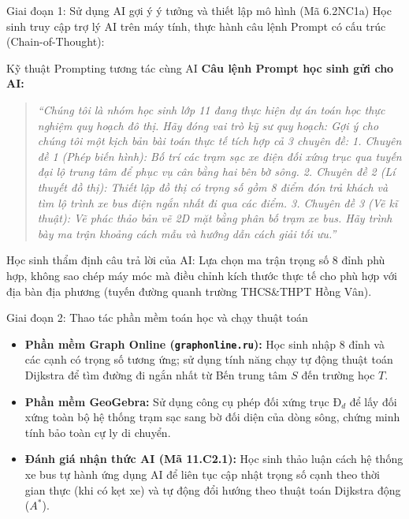 \documentclass[12pt, a4paper]{article}
\begin{document}
\begin{pedabox}{Giai đoạn 1: Sử dụng AI gợi ý ý tưởng và thiết lập mô hình (Mã 6.2NC1a)}
Học sinh truy cập trợ lý AI trên máy tính, thực hành câu lệnh Prompt có cấu trúc (Chain-of-Thought):
\begin{aibox}{Kỹ thuật Prompting tương tác cùng AI}
\textbf{Câu lệnh Prompt học sinh gửi cho AI:}
\begin{quote}
\textit{``Chúng tôi là nhóm học sinh lớp 11 đang thực hiện dự án toán học thực nghiệm quy hoạch đô thị. Hãy đóng vai trò kỹ sư quy hoạch: Gợi ý cho chúng tôi một kịch bản bài toán thực tế tích hợp cả 3 chuyên đề:
1. Chuyên đề 1 (Phép biến hình): Bố trí các trạm sạc xe điện đối xứng trục qua tuyến đại lộ trung tâm để phục vụ cân bằng hai bên bờ sông.
2. Chuyên đề 2 (Lí thuyết đồ thị): Thiết lập đồ thị có trọng số gồm 8 điểm đón trả khách và tìm lộ trình xe bus điện ngắn nhất đi qua các điểm.
3. Chuyên đề 3 (Vẽ kĩ thuật): Vẽ phác thảo bản vẽ 2D mặt bằng phân bố trạm xe bus.
Hãy trình bày ma trận khoảng cách mẫu và hướng dẫn cách giải tối ưu.''}
\end{quote}
\end{aibox}
Học sinh thẩm định câu trả lời của AI: Lựa chọn ma trận trọng số 8 đỉnh phù hợp, không sao chép máy móc mà điều chỉnh kích thước thực tế cho phù hợp với địa bàn địa phương (tuyến đường quanh trường THCS\&THPT Hồng Vân).
\end{pedabox}

\begin{pedabox}{Giai đoạn 2: Thao tác phần mềm toán học và chạy thuật toán}
\begin{itemize}[leftmargin=0.5cm]
    \item \textbf{Phần mềm Graph Online (\texttt{graphonline.ru}):} Học sinh nhập 8 đỉnh và các cạnh có trọng số tương ứng; sử dụng tính năng chạy tự động thuật toán Dijkstra để tìm đường đi ngắn nhất từ Bến trung tâm $S$ đến trường học $T$.
    \item \textbf{Phần mềm GeoGebra:} Sử dụng công cụ phép đối xứng trục $Đ_d$ để lấy đối xứng toàn bộ hệ thống trạm sạc sang bờ đối diện của dòng sông, chứng minh tính bảo toàn cự ly di chuyển.
    \item \textbf{Đánh giá nhận thức AI (Mã 11.C2.1):} Học sinh thảo luận cách hệ thống xe bus tự hành ứng dụng AI để liên tục cập nhật trọng số cạnh theo thời gian thực (khi có kẹt xe) và tự động đổi hướng theo thuật toán Dijkstra động ($A^*$).
\end{itemize}
\end{pedabox}
\end{document}
